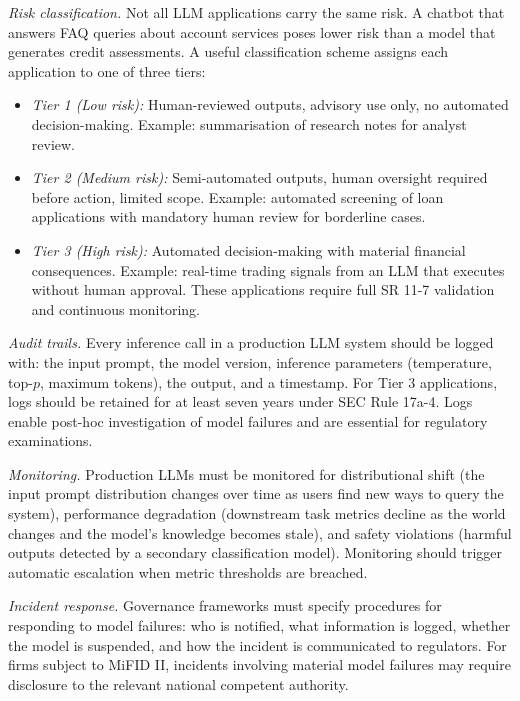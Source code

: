 \begin{context}
\emph{Risk classification.}  Not all LLM applications carry the same risk.
A chatbot that answers FAQ queries about account services poses lower risk than
a model that generates credit assessments.  A useful classification scheme
assigns each application to one of three tiers:
\begin{itemize}
  \item \emph{Tier 1 (Low risk):} Human-reviewed outputs, advisory use only,
        no automated decision-making.  Example: summarisation of research notes
        for analyst review.
  \item \emph{Tier 2 (Medium risk):} Semi-automated outputs, human oversight
        required before action, limited scope.  Example: automated screening of
        loan applications with mandatory human review for borderline cases.
  \item \emph{Tier 3 (High risk):} Automated decision-making with material
        financial consequences.  Example: real-time trading signals from an LLM
        that executes without human approval.  These applications require
        full SR 11-7 validation and continuous monitoring.
\end{itemize}

\emph{Audit trails.}  Every inference call in a production LLM system should
be logged with: the input prompt, the model version, inference parameters
(temperature, top-$p$, maximum tokens), the output, and a timestamp.  For
Tier 3 applications, logs should be retained for at least seven years under
SEC Rule 17a-4.  Logs enable post-hoc investigation of model failures and
are essential for regulatory examinations.

\emph{Monitoring.}  Production LLMs must be monitored for distributional shift
(the input prompt distribution changes over time as users find new ways to
query the system), performance degradation (downstream task metrics decline
as the world changes and the model's knowledge becomes stale), and safety
violations (harmful outputs detected by a secondary classification model).
Monitoring should trigger automatic escalation when metric thresholds are
breached.

\emph{Incident response.}  Governance frameworks must specify procedures for
responding to model failures: who is notified, what information is logged,
whether the model is suspended, and how the incident is communicated to
regulators.  For firms subject to MiFID II, incidents involving material
model failures may require disclosure to the relevant national competent
authority.


\end{context}
